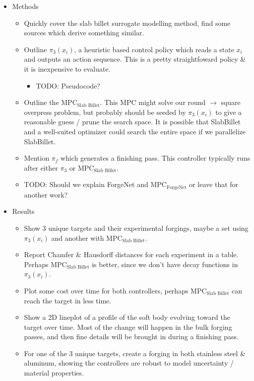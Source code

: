 \documentclass{article}
\begin{document}
\begin{itemize}
    \item Methods
    \begin{itemize}
        \item Quickly cover the slab billet surrogate modelling method, find some sources which derive something similar.
        \item Outline $\pi_3(x_i)$, a heuristic based control policy which reads a state $x_i$ and outputs an action sequence. This is a pretty straightfoward policy \& it is inexpensive to evaluate.
        \begin{itemize}
			\item TODO: Pseudocode?
		\end{itemize}
		\item Outline the $\text{MPC}_{\text{Slab Billet}}$. This MPC might solve our round $\rightarrow$ square overpress problem, but probably should be seeded by $\pi_3(x_i)$ to give a reasonable guess / prune the search space. It is possible that SlabBillet and a well-suited optimizer could search the entire space if we parallelize SlabBillet.
        \item Mention $\pi_f$ which generates a finishing pass. This controller typically runs after either $\pi_3$ or $\text{MPC}_{\text{Slab Billet}}$.
		\item TODO: Should we explain ForgeNet and $\text{MPC}_{\text{ForgeNet}}$ or leave that for another work?
    \end{itemize}

	\item Results
	\begin{itemize}
		\item Show 3 unique targets and their experimental forgings, maybe a set using $\pi_3(x_i)$ and another with $\text{MPC}_{\text{Slab Billet}}$.
		\item Report Chamfer \& Hausdorff distances for each experiment in a table. Perhaps $\text{MPC}_{\text{Slab Billet}}$ is better, since we don't have decay functions in $\pi_3(x_i)$.	
		\item Plot some cost over time for both controllers, perhaps $\text{MPC}_{\text{Slab Billet}}$ can reach the target in less time.
		\item Show a 2D lineplot of a profile of the soft body evolving toward the target over time. Most of the change will happen in the bulk forging passes, and then fine details will be brought in during a finishing pass.
		\item For one of the 3 unique targets, create a forging in both stainless steel \& aluminum, showing the controllers are robust to model uncertainty / material properties. 
	\end{itemize}

\end{itemize}
\noindent\hrulefill
\end{document}
